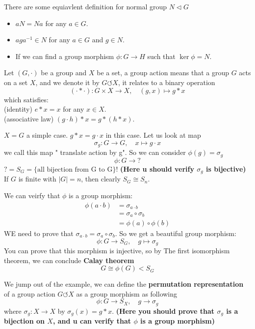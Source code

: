 \documentclass[en,geye,blue,normal,12pt]{elegantnote}
\begin{document}
\begin{proposition}
  There are some equiavlent definition for normal group \(N \vartriangleleft G\)
\end{proposition}
\begin{itemize}
  \item \(aN = Na\) for any \(a\in G\). 
  \item \(aga^{-1} \in N\) for any \(a \in G\) and \(g \in N\).
  \item If we can find a group morphism \(\phi: G \to H\) such that \(\ker\phi = N\).
\end{itemize}

\begin{definition}
  Let \((G,\cdot)\) be a group and \(X\) be a set, a group action means that a group \(G\) acts on a set \(X\), and we denote it by \(G \circlearrowleft X\), it relates to a binary operation 
  \[(\cdot * \cdot): G \times X \to X, \quad (g,x) \mapsto g*x\]
  which satisfies:\\
  (identity) \(e*x = x\) for any \(x \in X\).\\
  (associative law) \((g\cdot h)*x = g * (h * x) \).
\end{definition}

\begin{example}
  \(X = G\) a simple case. \(g*x = g\cdot x\) in this case. Let us look at map
  \[\sigma_g: G \to G, \quad x \mapsto g\cdot x\]
  we call this map " translate action by g". So we can consider \(\phi(g) = \sigma_g\)
  \[\phi: G \to ?\]
  \(? = S_G = \{\text{all bijection from G to G}\}\)! \textbf{(Here u should verify \(\sigma_g\) is bijective)} If \(G\) is finite with \(|G| = n\), then clearly \(S_G \cong S_n\).

  We can veirfy that \(\phi \) is a group morphism:
  \begin{align*}
    \phi(a\cdot b) &= \sigma_{a\cdot b} \\\
  &= \sigma_a \circ \sigma_b \\
  &= \phi(a)\circ \phi(b)
  \end{align*}
  WE need to prove that \(\sigma_{a\cdot b} = \sigma_a \circ \sigma_b \). So we get a beautiful group morphism:
  \[\phi: G \to S_G, \quad g \mapsto \sigma_g\]
  You can prove that this morphism is injective, so by The first isomorphism theorem, we can conclude \textbf{Calay theorem}
  \[G \cong \phi(G) < S_G\]
\end{example}

We jump out of the example, we can define the \textbf{permutation representation} of a group action \(G \circlearrowleft X\) as a group morphism as following
\[\phi: G \to S_X, \quad g \to \sigma_g\]
where \(\sigma_g: X \to X\) by \(\sigma_g(x) = g*x\). \textbf{(Here you should prove that \(\sigma_g\) is a bijection on \(X\), and u can verify that \(\phi\) is a group morphism)}
\end{document}
